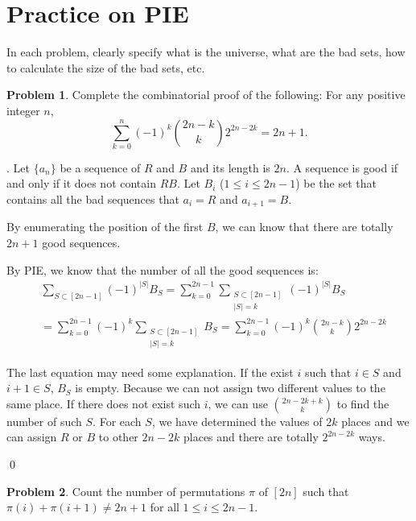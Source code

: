 \documentclass[12pt]{article}
\providecommand{\abs}[1]{\lvert#1\rvert}
\theoremstyle{definition}
\newtheorem{hw}{Problem}
\newenvironment{sol}
  {\par\vspace{3mm}\noindent{\it Solution}.}
  {\qed}
\begin{document}
\section{Practice on PIE}

In each problem, clearly specify what is the universe, what are the bad sets,
how to calculate the size of the bad sets, etc.

\begin{hw}
Complete the combinatorial proof of the following: For any positive integer
$n$,
\[
\sum_{k=0}^n(-1)^k \binom{2n-k}{k} 2^{2n-2k} = 2n+1.
\]
\end{hw}

\begin{sol}
	Let $\{a_n\}$ be a sequence of $R$ and $B$ and its length is $2n$. A sequence is good if and only if it does not contain $RB$. Let $B_i$ ($1 \leq i \leq 2n-1$) be the set that contains all the bad sequences that $a_i = R$ and $a_{i+1} = B$.
	
	By enumerating the position of the first $B$, we can know that there are totally $2n+1$ good sequences. 
	
	By PIE, we know that the number of all the good sequences is:
	\[ \begin{split}
		&   \sum_{S \subset [2n-1]}(-1)^{\abs{S}}B_{S}  
		    = \sum_{k = 0}^{2n-1}\sum_{\substack{S\subset [2n-1]\\ \abs{S}=k}} (-1)^{\abs{S}}B_{S} \\
		&   = \sum_{k = 0}^{2n-1}(-1)^k\sum_{\substack{S\subset [2n-1]\\ \abs{S}=k}}B_{S} 
		    =\sum_{k = 0}^{2n-1}(-1)^k \binom{2n-k}{k}2^{2n-2k}
	\end{split} \]
	
	The last equation may need some explanation. If the exist $i$ such that $i \in S$ and $i+1 \in S$, $B_S$ is empty. Because we can not assign two different values to the same place. If there does not exist such $i$, we can use $\binom{2n-2k + k}{k}$ to find the number of such $S$. For each $S$, we have determined the values of $2k$ places and we can assign $R$ or $B$ to other $2n-2k$ places and there are totally $2^{2n-2k}$ ways. 
	
	
\end{sol}

\begin{hw}
Count the number of permutations $\pi$ of $[2n]$ such that $\pi(i)+ \pi(i+1) \neq 2n+1$ for all $1 \leq i \leq 2n-1$.
\end{hw}
\end{document}
